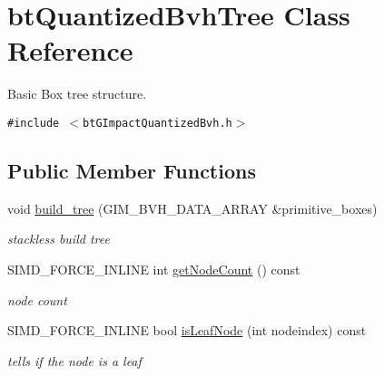 \hypertarget{classbt_quantized_bvh_tree}{
\section{btQuantizedBvhTree Class Reference}
\label{classbt_quantized_bvh_tree}
}
Basic Box tree structure.  


{\tt \#include $<$btGImpactQuantizedBvh.h$>$}

\subsection*{Public Member Functions}
\begin{Indent}{\bf }\par
\begin{CompactItemize}
\item 
void \hyperlink{classbt_quantized_bvh_tree_a2229fd3e3e2004cdf8151437535e936}{build\_\-tree} (GIM\_\-BVH\_\-DATA\_\-ARRAY \&primitive\_\-boxes)
\begin{CompactList}\small\item\em stackless build tree \item\end{CompactList}\item 
\hypertarget{classbt_quantized_bvh_tree_8f8b4acde8a974cb57d9d19b37009100}{
SIMD\_\-FORCE\_\-INLINE int \hyperlink{classbt_quantized_bvh_tree_8f8b4acde8a974cb57d9d19b37009100}{getNodeCount} () const }
\label{classbt_quantized_bvh_tree_8f8b4acde8a974cb57d9d19b37009100}

\begin{CompactList}\small\item\em node count \item\end{CompactList}\item 
\hypertarget{classbt_quantized_bvh_tree_004ff2bf4b2ef3d80d0e01a2ab249e5d}{
SIMD\_\-FORCE\_\-INLINE bool \hyperlink{classbt_quantized_bvh_tree_004ff2bf4b2ef3d80d0e01a2ab249e5d}{isLeafNode} (int nodeindex) const }
\label{classbt_quantized_bvh_tree_004ff2bf4b2ef3d80d0e01a2ab249e5d}

\begin{CompactList}\small\item\em tells if the node is a leaf \item\end{CompactList}\end{CompactItemize}
\end{Indent}


